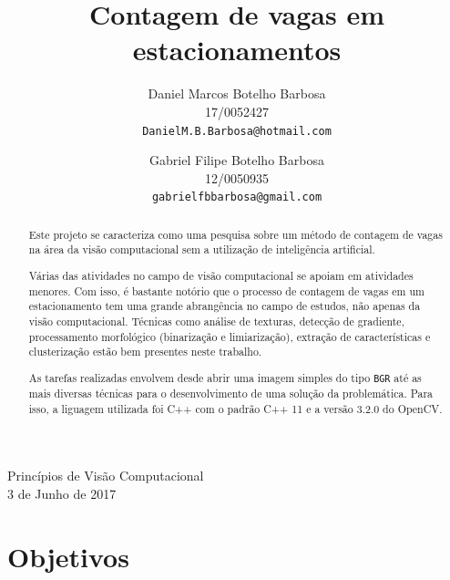 \documentclass[10pt,twocolumn,letterpaper]{article}
\begin{document}
\title{Contagem de vagas em estacionamentos}

Princípios de Visão Computacional\\
3 de Junho de 2017

\author{Daniel Marcos Botelho Barbosa\\
17/0052427\\
{\tt\small DanielM.B.Barbosa@hotmail.com}\\
\and
Gabriel Filipe Botelho Barbosa\\
12/0050935\\
{\tt\small gabrielfbbarbosa@gmail.com}
}

\maketitle






\begin{abstract}
	Este projeto se caracteriza como uma pesquisa sobre um método de contagem
de vagas na área da visão computacional sem a utilização de inteligência artificial.

	Várias das atividades no campo de visão computacional se apoiam em atividades
menores. Com isso, é bastante notório que o processo de contagem de vagas em um
estacionamento tem uma grande abrangência no campo de estudos, não apenas da
visão computacional. Técnicas como análise de texturas, detecção de gradiente,
processamento morfológico (binarização e limiarização), extração de características
e clusterização estão bem presentes neste trabalho.

	As tarefas realizadas envolvem desde abrir uma imagem simples do tipo \verb'BGR'
até as mais diversas técnicas para o desenvolvimento de uma solução da problemática.
Para isso, a liguagem utilizada foi C++ com o padrão C++ 11 e a versão 3.2.0 do OpenCV.\\
\end{abstract}





\section{Objetivos}
\end{document}
